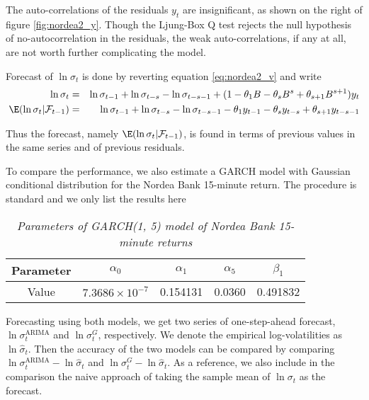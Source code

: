 The auto-correlations of the residuals $y_t$ are insignificant, as
shown on the right of figure \ref{fig:nordea2_y}. Though the Ljung-Box Q
test rejects the null hypothesis of no-autocorrelation in the
residuals, the weak auto-correlations, if any at all,  are not worth
further complicating the model.

Forecast of $\ln\sigma_t$ is done by reverting equation
\ref{eq:nordea2_v} and write
\begin{eqnarray*}
  \ln\sigma_t &=& \ln\sigma_{t-1} + \ln\sigma_{t-s} -
  \ln\sigma_{t-s-1} + (1 - \theta_1 B - \theta_s B^s + \theta_{s+1}
  B^{s+1} ) y_t \\
  \E(\ln\sigma_t | \mathcal{F}_{t-1}) &=& \ln\sigma_{t-1} + \ln\sigma_{t-s} -
  \ln\sigma_{t-s-1} - \theta_1 y_{t-1} - \theta_s y_{t-s} +
  \theta_{s+1} y_{t-s-1}
\end{eqnarray*}

Thus the forecast, namely $\E(\ln\sigma_t | \mathcal{F}_{t-1})$, is
found in terms of previous values in the same series and of previous
residuals. 

To compare the performance, we also estimate a GARCH model with
Gaussian conditional distribution for the Nordea Bank 15-minute
return. The procedure is standard and we only list the results here
\begin{table}[htb!]
  \centering
  \begin{tabular}{|c|c|c|c|c|}
    \hline
    Parameter & $\alpha_0$ & $\alpha_1$ & $\alpha_5$ & $\beta_1$ \\
    \hline
    Value & $7.3686 \times 10^{-7}$ & 0.154131 & 0.0360 & 0.491832 \\
    \hline
  \end{tabular}
  \caption{\small \it Parameters of GARCH(1, 5) model of Nordea
    Bank 15-minute returns}
  \label{tab:nordea2_garch}
\end{table}

Forecasting using both models, we get two series of one-step-ahead
forecast, $\ln \sigma^{\text{ARIMA}}_t$ and $\ln \sigma^G_t$,
respectively. We denote the empirical log-volatilities as $\ln
\hat{\sigma}_t$. Then the accuracy of the two models can be compared
by comparing $\ln \sigma^{\text{ARIMA}}_t - \ln \hat{\sigma}_t$ and
$\ln \sigma^G_t - \ln \hat{\sigma}_t$. As a reference, we also include
in the comparison the naive approach of taking the sample mean of
$\ln \sigma_t$ as the forecast.

